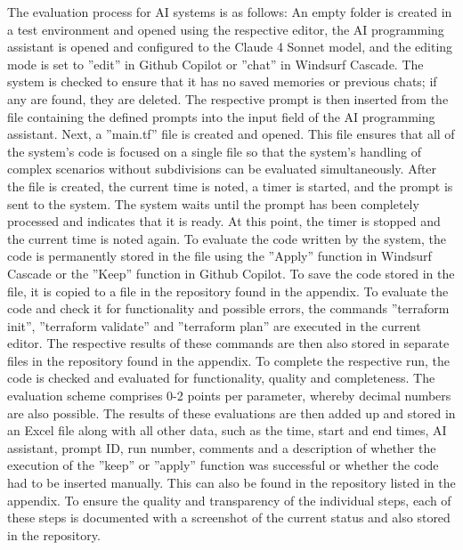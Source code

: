 The evaluation process for AI systems is as follows: An empty folder is created in a test environment and opened using the respective editor, the AI programming assistant is opened and configured to the Claude 4 Sonnet model, and the editing mode is set to ''edit'' in Github Copilot or ''chat'' in Windsurf Cascade. The system is checked to ensure that it has no saved memories or previous chats; if any are found, they are deleted. The respective prompt is then inserted from the file containing the defined prompts into the input field of the AI programming assistant. Next, a ''main.tf'' file is created and opened. This file ensures that all of the system's code is focused on a single file so that the system's handling of complex scenarios without subdivisions can be evaluated simultaneously. After the file is created, the current time is noted, a timer is started, and the prompt is sent to the system. The system waits until the prompt has been completely processed and indicates that it is ready. At this point, the timer is stopped and the current time is noted again. To evaluate the code written by the system, the code is permanently stored in the file using the ''Apply'' function in Windsurf Cascade or the ''Keep'' function in Github Copilot. To save the code stored in the file, it is copied to a file in the repository found in the appendix. To evaluate the code and check it for functionality and possible errors, the commands ''terraform init'', ''terraform validate'' and ''terraform plan'' are executed in the current editor. The respective results of these commands are then also stored in separate files in the repository found in the appendix. To complete the respective run, the code is checked and evaluated for functionality, quality and completeness. The evaluation scheme comprises 0-2 points per parameter, whereby decimal numbers are also possible. The results of these evaluations are then added up and stored in an Excel file along with all other data, such as the time, start and end times, AI assistant, prompt ID, run number, comments and a description of whether the execution of the ''keep'' or ''apply'' function was successful or whether the code had to be inserted manually. This can also be found in the repository listed in the appendix. To ensure the quality and transparency of the individual steps, each of these steps is documented with a screenshot of the current status and also stored in the repository. 

